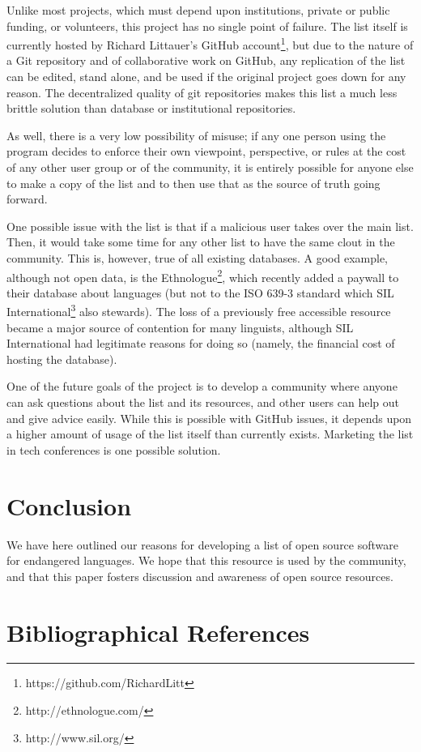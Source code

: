\documentclass[10pt, a4paper]{article}
\begin{document}
Unlike most projects, which must depend upon institutions, private or public funding, or volunteers, this project has no single point of failure. The list itself is currently hosted by Richard Littauer's GitHub account\footnote{https://github.com/RichardLitt}, but due to the nature of a Git repository and of collaborative work on GitHub, any replication of the list can be edited, stand alone, and be used if the original project goes down for any reason. The decentralized quality of git repositories makes this list a much less brittle solution than database or institutional repositories. 

As well, there is a very low possibility of misuse; if any one person using the program decides to enforce their own viewpoint, perspective, or rules at the cost of any other user group or of the community, it is entirely possible for anyone else to make a copy of the list and to then use that as the source of truth going forward. 

One possible issue with the list is that if a malicious user takes over the main list. Then, it would take some time for any other list to have the same clout in the community. This is, however, true of all existing databases. A good example, although not open data, is the Ethnologue\footnote{http://ethnologue.com/}, which recently added a paywall to their database about languages (but not to the ISO 639-3 standard which SIL International\footnote{http://www.sil.org/} also stewards). The loss of a previously free accessible resource became a major source of contention for many linguists, although SIL International had legitimate reasons for doing so (namely, the financial cost of hosting the database). 

One of the future goals of the project is to develop a community where anyone can ask questions about the list and its resources, and other users can help out and give advice easily. While this is possible with GitHub issues, it depends upon a higher amount of usage of the list itself than currently exists. Marketing the list in tech conferences is one possible solution. 

\section{Conclusion}

We have here outlined our reasons for developing a list of open source software for endangered languages. We hope that this resource is used by the community, and that this paper fosters discussion and awareness of open source resources. 

\section{Bibliographical References}
\label{main:ref}





\end{document}
